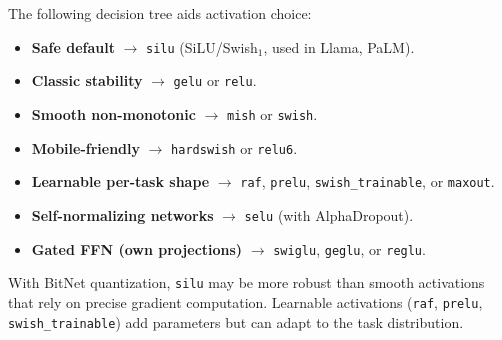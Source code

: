 The following decision tree aids activation choice:
\begin{itemize}[leftmargin=*]
  \item \textbf{Safe default} $\to$ \texttt{silu} (SiLU/Swish$_1$, used in
    Llama, PaLM).
  \item \textbf{Classic stability} $\to$ \texttt{gelu} or \texttt{relu}.
  \item \textbf{Smooth non-monotonic} $\to$ \texttt{mish} or \texttt{swish}.
  \item \textbf{Mobile-friendly} $\to$ \texttt{hardswish} or \texttt{relu6}.
  \item \textbf{Learnable per-task shape} $\to$ \texttt{raf},
    \texttt{prelu}, \texttt{swish\_trainable}, or \texttt{maxout}.
  \item \textbf{Self-normalizing networks} $\to$ \texttt{selu} (with
    AlphaDropout).
  \item \textbf{Gated FFN (own projections)} $\to$ \texttt{swiglu},
    \texttt{geglu}, or \texttt{reglu}.
\end{itemize}

\noindent With BitNet quantization, \texttt{silu} may be more robust than
smooth activations that rely on precise gradient computation. Learnable
activations (\texttt{raf}, \texttt{prelu}, \texttt{swish\_trainable}) add
parameters but can adapt to the task distribution.
